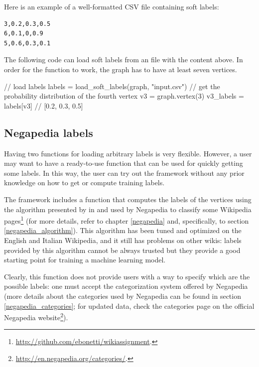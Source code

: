                 Here is an example of a well-formatted CSV file containing soft labels:
                \begin{lstlisting}
3,0.2,0.3,0.5
6,0.1,0,0.9
5,0.6,0.3,0.1
                \end{lstlisting}
                The following code can load soft labels from an  file with the content above. In order for the function to work, the graph has to have at least seven vertices.
                \begin{example}
// load labels
labels = load_soft_labels(graph, "input.csv")
// get the probability distribution of the fourth vertex
v3 = graph.vertex(3)
v3_labels = labels[v3] // [0.2, 0.3, 0.5]
                \end{example}
        \subsection{Negapedia labels}\label{negapedia_label_function}
            Having two functions for loading arbitrary labels is very flexible. However, a user may want to have a ready-to-use function that can be used for quickly getting some labels. In this way, the user can try out the framework without any prior knowledge on how to get or compute training labels.
            
            The framework includes a function that computes the labels of the vertices using the algorithm presented by \citeauthor{Bonetti} in \cite{Bonetti} and used by Negapedia to classify some Wikipedia pages\footnote{\url{http://github.com/ebonetti/wikiassignment}.} (for more details, refer to chapter \ref{negapedia} and, specifically, to section \ref{negapedia_algorithm}). This algorithm has been tuned and optimized on the English and Italian Wikipedia, and it still has problems on other wikis: labels provided by this algorithm cannot be always trusted but they provide a good starting point for training a machine learning model.
            
            Clearly, this function does not provide users with a way to specify which are the possible labels: one must accept the categorization system offered by Negapedia (more details about the categories used by Negapedia can be found in section \ref{negapedia_categories}; for updated data, check the categories page on the official Negapedia website\footnote{\url{http://en.negapedia.org/categories/}.}).
            
